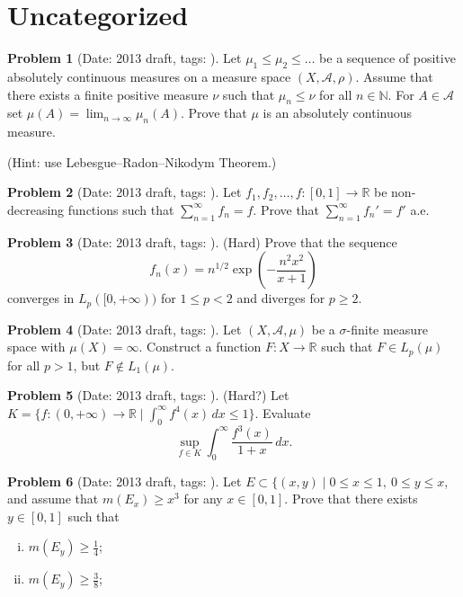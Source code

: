 \documentclass[11pt, notitlepage]{article}
\theoremstyle{definition}
\theoremstyle{definition}
\theoremstyle{definition}
\newtheorem{probstate}{Problem}
\theoremstyle{remark}
\newenvironment{problem}[2]{
    \begin{probstate}[Date: #1, tags: \texttt{#2}]
}
{
  \end{probstate}
}
\newcommand{\R}{\mathbb{R}}
\newcommand{\N}{\mathbb{N}}
\begin{document}
\section{Uncategorized}

\begin{problem}{2013 draft}{}
Let $\mu_1 \le \mu_2 \le \ldots$ be a sequence of
    positive absolutely continuous measures on a measure space $(X,
    \mathcal{A},\rho)$. Assume that there exists a finite positive measure
    $\nu$ such that $\mu_n \le \nu$ for all $n\in \N$. For $A \in
    \mathcal{A}$ set $\mu(A) = \lim_{n \to \infty} \mu_n(A)$. Prove
    that $\mu$ is an absolutely continuous measure.

    (Hint: use Lebesgue--Radon--Nikodym Theorem.)
\end{problem}

\begin{problem}{2013 draft}{}
Let $f_1, f_2, \ldots,f: [0,1] \to \R$ be non-decreasing functions such that $\sum_{n=1}^{\infty} f_n =f$. Prove that $\sum_{n=1}^{\infty} f_n' =f'$ a.e.
\end{problem}

\begin{problem}{2013 draft}{}
(Hard) Prove that the sequence
    \[
     f_n(x)= n^{1/2} \exp \left(- \frac{n^2x^2}{x+1} \right)
    \]
    converges in $L_p([0,+\infty))$ for $1 \le p<2$ and diverges for $p \ge 2$.
\end{problem}

\begin{problem}{2013 draft}{}
Let  $(X, \mathcal{A},\mu)$ be a $\sigma$-finite measure space with $\mu(X)=\infty$. Construct a function $F: X \to \R$ such that $F \in L_p(\mu)$ for all $p>1$, but $F \notin L_1(\mu)$.
\end{problem}

\begin{problem}{2013 draft}{}
(Hard?) Let $K=\{f :(0,+\infty) \to \R \mid \int_0^{\infty} f^4(x) \, dx \le 1  \}$. Evaluate
\[
  \sup_{f \in K} \int_0^\infty \frac{f^3(x)}{1+x}  \, dx.
\]
\end{problem}

\begin{problem}{2013 draft}{}
Let $E \subset \{(x,y) \mid 0 \le x \le 1, \ 0 \le y \le x$, and assume that $m(E_x) \ge x^3$ for any $x \in [0,1]$. Prove that there exists $y \in [0,1]$ such that 
\begin{enumerate}[(i)]
 \item $m(E_y) \ge \frac{1}{4}$;
 \item $m(E_y) \ge \frac{3}{8}$; 
\end{enumerate}
\end{problem}
\end{document}
